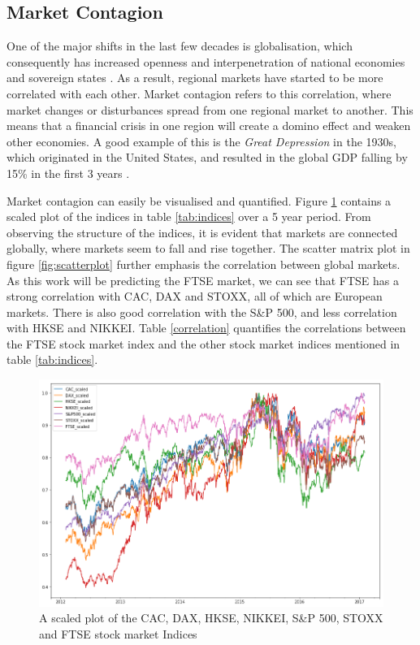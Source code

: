 \documentclass{UoYCSproject}
\begin{document}
\subsection{Market Contagion}
One of the major shifts in the last few decades is globalisation, which consequently has increased openness and interpenetration of national economies and sovereign states \cite{scott1999regions}. As a result, regional markets have started to be more correlated with each other. Market contagion refers to this correlation, where market changes or disturbances spread from one regional market to another. This means that a financial crisis in one region will create a domino effect and weaken other economies. A good example of this is the \textit{Great Depression} in the 1930s, which originated in the United States, and resulted in the global GDP falling by 15\% in the first 3 years \cite{rogerhistoryrepeating}.   

Market contagion can easily be visualised and quantified. Figure \ref{fig:stockindexplot} contains a scaled plot of the indices in table \ref{tab:indices} over a 5 year period. From observing the structure of the indices, it is evident that markets are connected globally, where markets seem to fall and rise together. The scatter matrix plot in figure \ref{fig:scatterplot} further emphasis the correlation between global markets. As this work will be predicting the FTSE market, we can see that FTSE has a strong correlation with CAC, DAX and STOXX, all of which are European markets. There is also good correlation with the S\&P 500, and less correlation with HKSE and NIKKEI. Table \ref{correlation} quantifies the correlations between the FTSE stock market index and the other stock market indices mentioned in table \ref{tab:indices}. 

\begin{figure}[h]
\includegraphics[width=12cm]{scaled_plot_of_indices}
\centering
\caption{A scaled plot of the CAC, DAX, HKSE, NIKKEI, S\&P 500, STOXX and FTSE stock market Indices} 
\label{fig:stockindexplot}
\end{figure}
\end{document}
